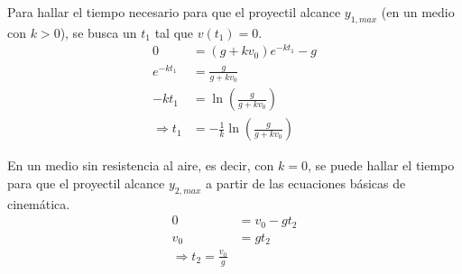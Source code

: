 


\vspace{5 mm}
Para hallar el tiempo necesario para que el proyectil alcance $y_{1,max}$ (en un medio con $k>0$), se busca un $t_{1}$ tal que $v(t_{1})=0$.
\begin{align*}
    0 &= (g+kv_{0})e^{-kt_{1}}-g \\
    e^{-kt_{1}} &= \frac{g}{g+kv_{0}} \\
    -kt_{1} &= \ln \left(\frac{g}{g+kv_{0}}\right) \\
    \Rightarrow t_{1} &= -\frac{1}{k} \ln \left(\frac{g}{g+kv_{0}}\right)
\end{align*}

\vspace{5 mm}
En un medio sin resistencia al aire, es decir, con $k=0$, se puede hallar el tiempo para que el proyectil alcance 
$y_{2,max}$ a partir de las ecuaciones básicas de cinemática.
\begin{align*}
    0 &= v_{0} -gt_{2} \\
    v_{0} &= gt_{2} \\
    \Rightarrow t_{2} = \frac{v_{0}}{g}
\end{align*}